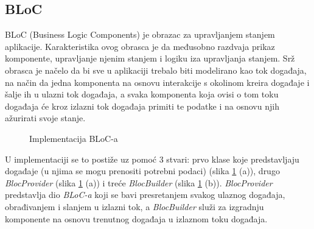 \documentclass[times, utf8, zavrsni]{fer}
\begin{document}
\subsection{BLoC}
BLoC (Business Logic Components) je obrazac za upravljanjem stanjem aplikacije. Karakteristika ovog obrasca
je da međusobno razdvaja prikaz komponente, upravljanje njenim stanjem i logiku iza upravljanja stanjem.
Srž obrasca je načelo da bi sve u aplikaciji trebalo biti modelirano kao tok događaja, na način da jedna komponenta
na osnovu interakcije s okolinom kreira događaje i šalje ih u ulazni tok događaja, a svaka komponenta koja
ovisi o tom toku događaja će kroz izlazni tok događaja primiti te podatke i na osnovu njih ažurirati svoje stanje.
\begin{figure}[h]
      \centering
      \caption{Implementacija BLoC-a}
      \label{fig:BLoC}
\end{figure}
U implementaciji se to postiže uz pomoć 3 stvari: prvo klase koje predstavljaju događaje (u njima se mogu prenositi
potrebni podaci) (slika \ref{fig:BLoC} (a)), drugo \textit{BlocProvider} (slika \ref{fig:BLoC} (a))
i treće \textit{BlocBuilder} (slika \ref{fig:BLoC} (b)). \textit{BlocProvider} predstavlja dio \textit{BLoC-a}
koji se bavi presretanjem svakog ulaznog događaja, obrađivanjem i slanjem u izlazni tok, a \textit{BlocBuilder}
služi za izgradnju komponente na osnovu trenutnog događaja u izlaznom toku događaja.
\end{document}
